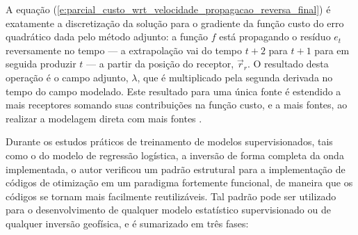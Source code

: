   A equação (\ref{e:parcial_custo_wrt_velocidade_propagacao_reversa_final}) é exatamente a discretização da solução para o gradiente da função custo do erro quadrático dada pelo método adjunto: a função $f$ está propagando o resíduo $e_t$ reversamente no tempo --- a extrapolação vai do tempo $t+2$ para $t+1$ para em seguida produzir $t$ --- a partir da posição do receptor, $\vec{r}_r$. O resultado desta operação é o campo adjunto, $\lambda$, que é multiplicado pela segunda derivada no tempo do campo modelado. Este resultado para uma única fonte é estendido a mais receptores somando suas contribuições na função custo, e a mais fontes, ao realizar a modelagem direta com mais fontes .


 \label{a:guia_treinamento}

    Durante os estudos práticos de treinamento de modelos supervisionados, tais como o do modelo de regressão logística, a inversão de forma completa da onda implementada, o autor verificou um padrão estrutural para a implementação de códigos de otimização em um paradigma fortemente funcional, de maneira que os códigos se tornam mais facilmente reutilizáveis. Tal padrão pode ser utilizado para o desenvolvimento de qualquer modelo estatístico supervisionado ou de qualquer inversão geofísica, e é sumarizado em três fases:

